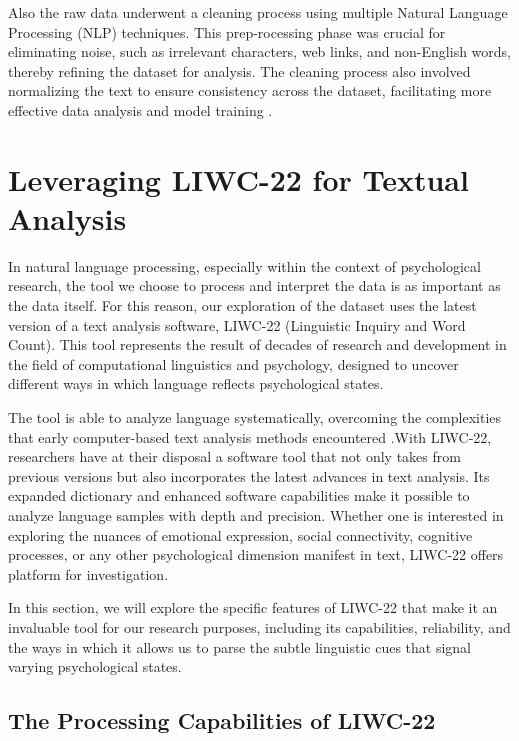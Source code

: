 Also the raw data underwent a cleaning process using multiple Natural Language Processing (NLP) techniques. This prep-rocessing phase was crucial for eliminating noise, such as irrelevant characters, web links, and non-English words, thereby refining the dataset for analysis. The cleaning process also involved normalizing the text to ensure consistency across the dataset, facilitating more effective data analysis and model training \cite{depressionDataset}.

\section{Leveraging LIWC-22 for Textual Analysis}

\quad In natural language processing, especially within the context of psychological research, the tool we choose to process and interpret the data is as important as the data itself. For this reason, our exploration of the dataset uses the latest version of a text analysis software, LIWC-22 (Linguistic Inquiry and Word Count). This tool represents the result of decades of research and development in the field of computational linguistics and psychology, designed to uncover different ways in which language reflects psychological states.

The tool is able to analyze language systematically, overcoming the complexities that early computer-based text analysis methods encountered \cite{boyd2022development}.With LIWC-22, researchers have at their disposal a software tool that not only takes from previous versions but also incorporates the latest advances in text analysis. Its expanded dictionary and enhanced software capabilities make it possible to analyze language samples with depth and precision. Whether one is interested in exploring the nuances of emotional expression, social connectivity, cognitive processes, or any other psychological dimension manifest in text, LIWC-22 offers platform for investigation.

In this section, we will explore the specific features of LIWC-22 that make it an invaluable tool for our research purposes, including its capabilities, reliability, and the ways in which it allows us to parse the subtle linguistic cues that signal varying psychological states. 

\subsection{The Processing Capabilities of LIWC-22}

